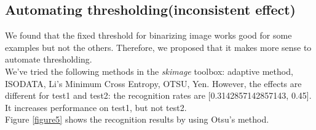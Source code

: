 \documentclass{extarticle}
\theoremstyle{definition}
\theoremstyle{definition}
\begin{document}
\subsection{Automating thresholding(inconsistent effect)}
We found that the fixed threshold for binarizing image works good for some examples but not the others. Therefore, we proposed that it makes more sense to automate thresholding.\\
We've tried the following methods in the \textit{skimage} toolbox: adaptive method, ISODATA, Li's Minimum Cross Entropy, OTSU, Yen. However, the effects are different for test1 and test2: the recognition rates are [0.3142857142857143, 0.45]. It increases performance on test1, but not test2.\\
Figure \ref{figure5} shows the recognition results by using Otsu's method. \\
\end{document}
